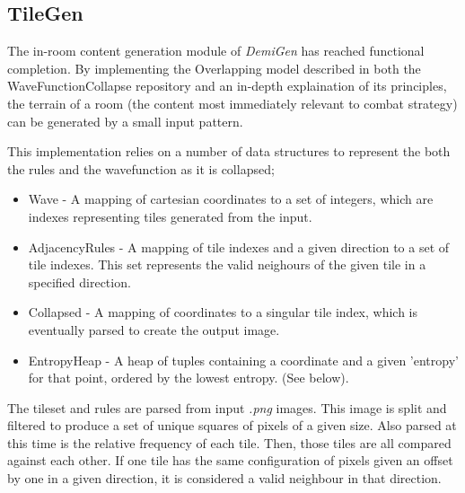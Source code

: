 \documentclass{article}
\begin{document}
\subsection{TileGen}
The in-room content generation module of \textit{DemiGen} has reached functional completion. By implementing the Overlapping model described in both the WaveFunctionCollapse\cite{wfc-report} repository and an in-depth explaination of its principles\cite{wfc-article}, the terrain of a room (the content most immediately relevant to combat strategy) can be generated by a small input pattern.




This implementation relies on a number of data structures to represent the both the rules and the wavefunction as it is collapsed;
\begin{itemize}
    \item Wave - A mapping of cartesian coordinates to a set of integers, which are indexes representing tiles generated from the input.
    \item AdjacencyRules - A mapping of tile indexes and a given direction to a set of tile indexes. This set represents the valid neighours of the given tile in a specified direction.
    \item Collapsed - A mapping of coordinates to a singular tile index, which is eventually parsed to create the output image.
    \item EntropyHeap - A heap of tuples containing a coordinate and a given 'entropy' for that point, ordered by the lowest entropy. (See below).
\end{itemize}
The tileset and rules are parsed from input \textit{.png} images. This image is split and filtered to produce a set of unique squares of pixels of a given size. Also parsed at this time is the relative frequency of each tile. Then, those tiles are all compared against each other. If one tile has the same configuration of pixels given an offset by one in a given direction, it is considered a valid neighbour in that direction.
\end{document}
